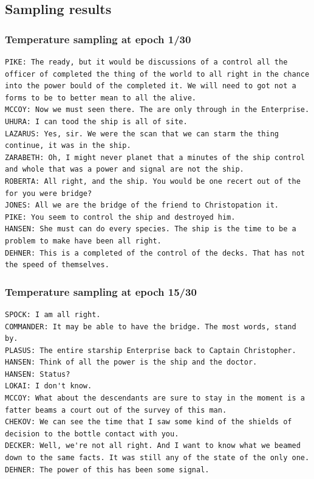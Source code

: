 \documentclass[twocolumn, 9pt]{article}
\begin{document}
\subsection*{Sampling results}
\subsubsection*{Temperature sampling at epoch 1/30}
\begin{lstlisting}
PIKE: The ready, but it would be discussions of a control all the officer of completed the thing of the world to all right in the chance into the power bould of the completed it. We will need to got not a forms to be to better mean to all the alive.
MCCOY: Now we must seen there. The are only through in the Enterprise.
UHURA: I can tood the ship is all of site.
LAZARUS: Yes, sir. We were the scan that we can starm the thing continue, it was in the ship.
ZARABETH: Oh, I might never planet that a minutes of the ship control and whole that was a power and signal are not the ship.
ROBERTA: All right, and the ship. You would be one recert out of the for you were bridge?
JONES: All we are the bridge of the friend to Christopation it.
PIKE: You seem to control the ship and destroyed him.
HANSEN: She must can do every species. The ship is the time to be a problem to make have been all right.
DEHNER: This is a completed of the control of the decks. That has not the speed of themselves.
\end{lstlisting}

\subsubsection*{Temperature sampling at epoch 15/30}
\begin{lstlisting}
SPOCK: I am all right.
COMMANDER: It may be able to have the bridge. The most words, stand by.
PLASUS: The entire starship Enterprise back to Captain Christopher.
HANSEN: Think of all the power is the ship and the doctor.
HANSEN: Status?
LOKAI: I don't know.
MCCOY: What about the descendants are sure to stay in the moment is a fatter beams a court out of the survey of this man.
CHEKOV: We can see the time that I saw some kind of the shields of decision to the bottle contact with you.
DECKER: Well, we're not all right. And I want to know what we beamed down to the same facts. It was still any of the state of the only one.
DEHNER: The power of this has been some signal.
\end{lstlisting}
\end{document}
